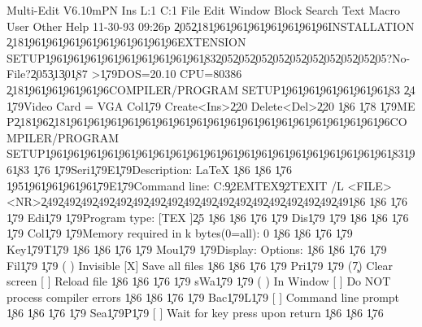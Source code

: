 Multi-Edit V6.10mPN                                          Ins  L:1     C:1   
File Edit Window Block Search Text Macro User Other Help         11-30-93 09:26p
\c{205}\c{218}\c{196}\c{196}\c{196}\c{196}\c{196}\c{196}\c{196}INSTALLATION \c{218}\c{196}\c{196}\c{196}\c{196}\c{196}\c{196}\c{196}\c{196}\c{196}EXTENSION SETUP\c{196}\c{196}\c{196}\c{196}\c{196}\c{196}\c{196}\c{196}\c{196}\c{183}\c{205}\c{205}\c{205}\c{205}\c{205}\c{205}\c{205}\c{205}\c{205}\c{205}?No-File?\c{205}\c{31}\c{30}\c{187}
>\c{179}DOS=20.10 CPU=80386 \c{218}\c{196}\c{196}\c{196}\c{196}\c{196}COMPILER/PROGRAM SETUP\c{196}\c{196}\c{196}\c{196}\c{196}\c{196}\c{183}                      \c{24}
 \c{179}Video Card = VGA Col\c{179}    Create<Ins>\c{220} Delete<Del>\c{220}    \c{186}                      \c{178}
 \c{179}ME P\c{218}\c{196}\c{218}\c{196}\c{196}\c{196}\c{196}\c{196}\c{196}\c{196}\c{196}\c{196}\c{196}\c{196}\c{196}\c{196}\c{196}\c{196}\c{196}\c{196}\c{196}\c{196}COMPILER/PROGRAM SETUP\c{196}\c{196}\c{196}\c{196}\c{196}\c{196}\c{196}\c{196}\c{196}\c{196}\c{196}\c{196}\c{196}\c{196}\c{196}\c{196}\c{196}\c{196}\c{196}\c{196}\c{183}\c{196}\c{183}      \c{176}
 \c{179}Seri\c{179}E\c{179}Description:  LaTeX                                          \c{186} \c{186}      \c{176}
 \c{195}\c{196}\c{196}\c{196}\c{196}\c{179}E\c{179}Command line: C:\c{92}EMTEX\c{92}TEXIT /L <FILE> <NR>\c{249}\c{249}\c{249}\c{249}\c{249}\c{249}\c{249}\c{249}\c{249}\c{249}\c{249}\c{249}\c{249}\c{249}\c{249}\c{249}\c{249}\c{249}\c{186} \c{186}      \c{176}
 \c{179} Edi\c{179} \c{179}Program type: [TEX                 ]\c{25}                        \c{186} \c{186}      \c{176}
 \c{179} Dis\c{179} \c{179}                                                             \c{186} \c{186}      \c{176}
 \c{179} Col\c{179} \c{179}Memory required in k bytes(0=all): 0                         \c{186} \c{186}      \c{176}
 \c{179} Key\c{179}T\c{179}                                                             \c{186} \c{186}      \c{176}
 \c{179} Mou\c{179} \c{179}Display:               Options:                              \c{186} \c{186}      \c{176}
 \c{179} Fil\c{179} \c{179}  ( ) Invisible          [X] Save all files                  \c{186} \c{186}      \c{176}
 \c{179} Pri\c{179} \c{179}  (\c{7}) Clear screen       [ ] Reload file                     \c{186} \c{186}      \c{176}
 \c{179} sWa\c{179} \c{179}  ( ) In Window          [ ] Do NOT process compiler errors  \c{186} \c{186}      \c{176}
 \c{179} Bac\c{179}L\c{179}                         [ ] Command line prompt             \c{186} \c{186}      \c{176}
 \c{179} Sea\c{179}P\c{179}                         [ ] Wait for key press upon return  \c{186} \c{186}      \c{176}

